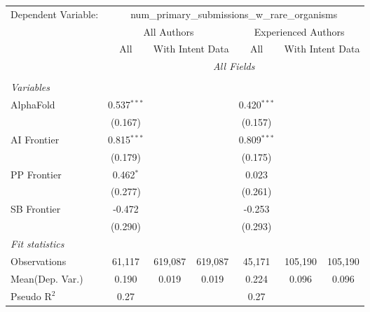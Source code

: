 \begingroup
\centering
\begin{tabular}{lcccccc}
   \tabularnewline \midrule \midrule
   Dependent Variable: & \multicolumn{6}{c}{num\_primary\_submissions\_w\_rare\_organisms}\\
 & \multicolumn{3}{c}{All Authors} & \multicolumn{3}{c}{Experienced Authors} \\
\cmidrule(lr){2-4} \cmidrule(lr){5-7}
 & \multicolumn{1}{c}{All} & \multicolumn{2}{c}{With Intent Data} & \multicolumn{1}{c}{All} & \multicolumn{2}{c}{With Intent Data} \\
\cmidrule(lr){2-2} \cmidrule(lr){3-4} \cmidrule(lr){5-5} \cmidrule(lr){6-7}
 & \multicolumn{6}{c}{\textit{All Fields}} \\ \\
   \emph{Variables}\\
   AlphaFold    & 0.537$^{***}$ &         &         & 0.420$^{***}$ &         &   \\   
                & (0.167)       &         &         & (0.157)       &         &   \\   
   AI Frontier  & 0.815$^{***}$ &         &         & 0.809$^{***}$ &         &   \\   
                & (0.179)       &         &         & (0.175)       &         &   \\   
   PP Frontier  & 0.462$^{*}$   &         &         & 0.023         &         &   \\   
                & (0.277)       &         &         & (0.261)       &         &   \\   
   SB Frontier  & -0.472        &         &         & -0.253        &         &   \\   
                & (0.290)       &         &         & (0.293)       &         &   \\   
   \midrule
   \emph{Fit statistics}\\
   Observations & 61,117        & 619,087 & 619,087 & 45,171        & 105,190 & 105,190\\  
Mean(Dep. Var.) & 0.190 & 0.019 & 0.019 & 0.224 & 0.096 & 0.096 \\
   Pseudo R$^2$ & 0.27          &         &         & 0.27          &         & \\  
   

\end{tabular}
